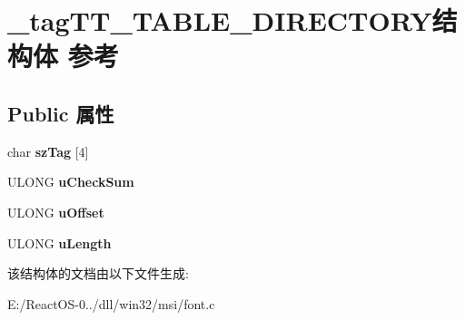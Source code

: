 \hypertarget{struct__tag_t_t___t_a_b_l_e___d_i_r_e_c_t_o_r_y}{}\section{\+\_\+tag\+T\+T\+\_\+\+T\+A\+B\+L\+E\+\_\+\+D\+I\+R\+E\+C\+T\+O\+R\+Y结构体 参考}
\label{struct__tag_t_t___t_a_b_l_e___d_i_r_e_c_t_o_r_y}
\subsection*{Public 属性}
\begin{DoxyCompactItemize}
\item 
\mbox{\label{struct__tag_t_t___t_a_b_l_e___d_i_r_e_c_t_o_r_y_af1f4276e2d7a1a75a57712401966ebb3}} 
char {\bfseries sz\+Tag} \mbox{[}4\mbox{]}
\item 
\mbox{\label{struct__tag_t_t___t_a_b_l_e___d_i_r_e_c_t_o_r_y_a4c5dce2df839fdc5929c5df6a37b5122}} 
U\+L\+O\+NG {\bfseries u\+Check\+Sum}
\item 
\mbox{\label{struct__tag_t_t___t_a_b_l_e___d_i_r_e_c_t_o_r_y_a5d5ee417e88dae3573214ec6f2d6fa3b}} 
U\+L\+O\+NG {\bfseries u\+Offset}
\item 
\mbox{\label{struct__tag_t_t___t_a_b_l_e___d_i_r_e_c_t_o_r_y_a997f427004e25ca781f0500cc7af99cc}} 
U\+L\+O\+NG {\bfseries u\+Length}
\end{DoxyCompactItemize}


该结构体的文档由以下文件生成\+:\begin{DoxyCompactItemize}
\item 
E\+:/\+React\+O\+S-\/0../dll/win32/msi/font.\+c\end{DoxyCompactItemize}
